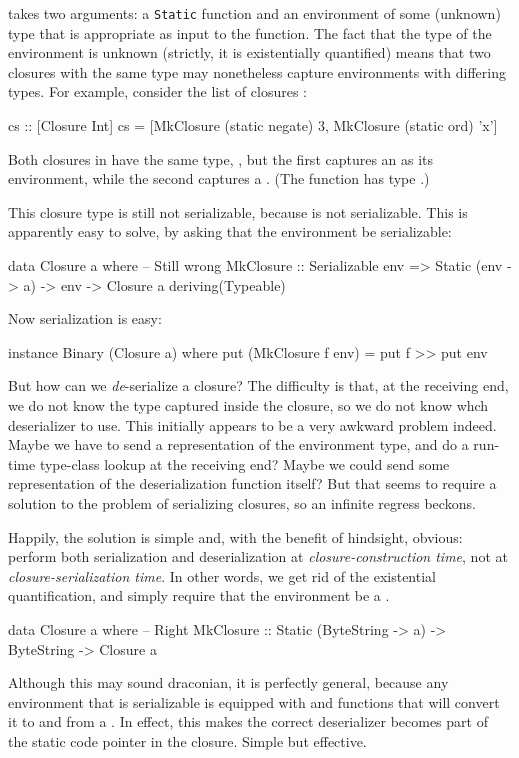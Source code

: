 \documentclass[preprint]{sigplanconf}
\begin{document}
 takes two arguments: a \texttt{Static} function and an environment of some (unknown) type  that is appropriate as input to the function.
The fact that the type of the environment is unknown (strictly, it is existentially quantified) means 
that two closures with the same type may nonetheless capture environments
with differing types.  For example, consider the list of closures :
\begin{code}
  cs :: [Closure Int]
  cs = [MkClosure (static negate) 3,
        MkClosure (static ord)   'x']
\end{code}
Both closures in  have the same type, ,
but the first captures an  as its environment, while the second
captures a \mbox{.}  
(The function  has type .)

This closure type is still not serializable, because  is not serializable.
This is apparently easy to solve, by asking
that the environment be serializable:
\begin{code}
data Closure a where   -- Still wrong
  MkClosure :: Serializable env =>
        			Static (env -> a) -> env -> Closure a
  deriving(Typeable)
\end{code}
Now serialization is easy:
\begin{code}
instance Binary (Closure a) where
   put (MkClosure f env) = put f >> put env
\end{code}
But how can we \emph{de}-serialize a closure?  The difficulty is
that, at the receiving end, we do not know the type captured inside
the closure, so we do not know whch deserializer to use.  This initially
appears to be a very awkward problem indeed. Maybe we have to send a 
representation of the environment type, and do a run-time type-class lookup
at the receiving end?  Maybe
we could send some representation of the deserialization function itself?
But that seems to require a solution to the problem of serializing 
closures, so an infinite regress beckons.

Happily, the solution is simple and, with the benefit of hindsight,
obvious: perform both serialization and deserialization at \emph{closure-construction time},
not at \emph{closure-serialization time}.  
In other words, we get rid of the existential quantification, and simply require that the environment be a .  

\begin{code}
data Closure a where   -- Right
  MkClosure :: Static (ByteString -> a) ->
									ByteString -> Closure a
\end{code}
Although this may sound draconian, it is perfectly general, because any environment  that is serializable is equipped with  and  functions that will convert it to and from a . 
In effect, this makes the  correct deserializer becomes part of the static code pointer in the closure.  Simple but effective.
\end{document}
